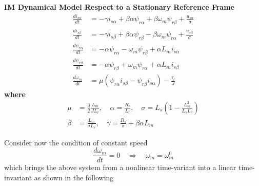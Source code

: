 \documentclass[11pt,a4paper,oneside]{book}
\numberwithin{equation}{section}
\theoremstyle{it}
\theoremstyle{definition}
\begin{document}
\begin{mybox}
	\textbf{IM Dynamical Model Respect to a Stationary Reference Frame}
	\begin{equation}\label{im_eq_33}
		\begin{aligned}
			\frac{di_{s\alpha}}{dt} &= -\gamma i_{s\alpha}  + 
			\beta\alpha\psi_{r\alpha}+\beta\omega_m\psi_{r\beta} + 
			\frac{u_{s\alpha}}{\sigma}\\[6pt]
			\frac{di_{s\beta}}{dt} &= -\gamma i_{s\beta}  + 
			\beta\alpha\psi_{r\beta}-\beta\omega_m\psi_{r\alpha} + 
			\frac{u_{s\beta}}{\sigma} \\[6pt]
			\frac{d\psi_{r\alpha}}{dt} &= -\alpha \psi_{r\alpha} 
			-\omega_m\psi_{r\beta}+\alpha L_m i_{s\alpha} \\[6pt]
			\frac{d\psi_{r\beta}}{dt} &= -\alpha \psi_{r\beta} 
			+\omega_m\psi_{r\alpha}+\alpha L_m i_{s\beta} \\[6pt]
			\frac{d\omega_m}{dt} &= \mu \left(\psi_{r\alpha}i_{s\beta} - 
			\psi_{r\beta}i_{s\alpha}\right)-\frac{\tau_l}{J}
		\end{aligned}
	\end{equation}
	\textbf{where}
	\begin{equation}\label{im_eq_34}
		\begin{aligned}
			\mu & = \frac{3}{2}\frac{L_m}{JL_r}, \quad
			\alpha = \frac{R_r}{L_r},  \quad
			\sigma = L_s \left(1-\frac{L_m^2}{L_sL_r}\right) \\[6pt]
			\beta & = \frac{L_m}{\sigma L_r},  \quad
			\gamma = \frac{R_s}{\sigma} + \beta \alpha L_m
		\end{aligned}
	\end{equation}
\end{mybox}
Consider now the condition of constant speed
\begin{equation}\label{im_eq_35}
	\frac{d\omega_m}{dt}=0 \quad\Rightarrow\quad\omega_m=\omega_m^0
\end{equation}
which brings the above system from a nonlinear time-variant into a linear 
time-invariant as shown in the following
\end{document}

